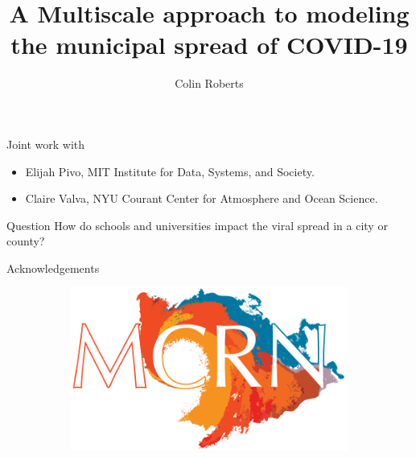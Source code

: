 \documentclass[UKenglish]{beamer}
\author{Colin Roberts}
\title{A Multiscale approach to modeling the municipal spread of COVID-19}
\subtitle{}
\begin{document}
\begin{frame}{}
\vfill
    Joint work with
    \begin{itemize}
        \item Elijah Pivo, MIT Institute for Data, Systems, and Society.
        \item Claire Valva, NYU Courant Center for Atmosphere and Ocean Science.
    \end{itemize}
    \vfill
\end{frame}

\begin{frame}{Question}
\vfill
    \center
    How do schools and universities impact the viral spread in a city or county?
\vfill
\end{frame}




\begin{frame}{Acknowledgements}
\vfill
\begin{figure}
     \centering
     \begin{subfigure}[b]{0.45\textwidth}
         \centering
         \includegraphics[width=\textwidth]{figures/mcrn_logo.png}
     \end{subfigure}
     \hfill
     \begin{subfigure}[b]{0.3\textwidth}
         \centering

\end{subfigure}
\end{figure}
\end{frame}
\end{document}
